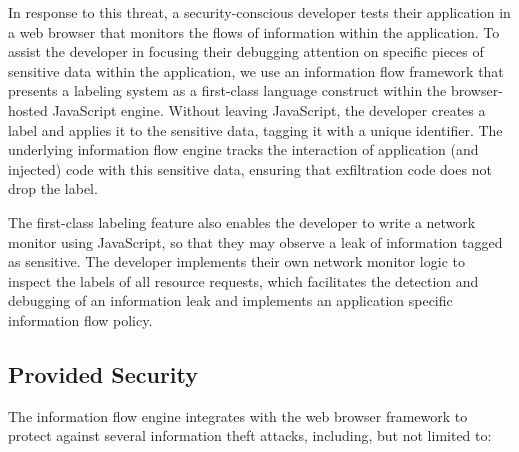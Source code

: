 In response to this threat, a security-conscious developer tests their application in a web browser that monitors the flows of information within the application.
To assist the developer in focusing their debugging attention on specific pieces of sensitive data within the application, we use an information flow framework that presents a labeling system as a first-class language construct within the browser-hosted JavaScript engine.
Without leaving JavaScript, the developer creates a label and applies it to the sensitive data, tagging it with a unique identifier.
The underlying information flow engine tracks the interaction of application (and injected) code with this sensitive data, ensuring that exfiltration code does not drop the label.

The first-class labeling feature also enables the developer to write a network monitor using JavaScript, so that they may observe a leak of information tagged as sensitive.
The developer implements their own network monitor logic to inspect the labels of all resource requests, which facilitates the detection and debugging of an information leak and implements an application specific information flow policy.

\subsection{Provided Security}\label{sec:defense-providedsecurity}

The information flow engine integrates with the web browser framework to protect against several information theft attacks, including, but not limited to:

